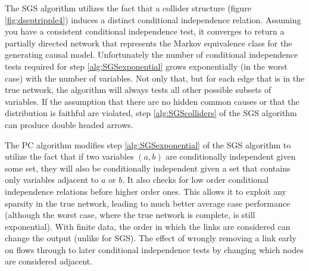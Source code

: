 \documentclass[11pt,a4paper,oneside]{book}
\begin{document}
The SGS algorithm utilizes the fact that a collider structure (figure \ref{fig:dseptripple4}) induces a distinct conditional independence relation. Assuming you have a consistent conditional independence test, it converges to return a partially directed network that represents the Markov equivalence class for the generating causal model. Unfortunately the number of conditional independence tests required for step \ref{alg:SGSexponential} grows exponentially (in the worst case) with the number of variables. Not only that, but for each edge that is in the true network, the algorithm will always tests all other possible subsets of variables. If the assumption that there are no hidden common causes or that the distribution is faithful are violated, step \ref{alg:SGScolliders} of the SGS algorithm can produce double headed arrows.

The PC algorithm \cite{Sprites} modifies step \ref{alg:SGSexponential} of the SGS algorithm to utilize the fact that if two variables $(a,b)$ are conditionally independent given some set, they will also be conditionally independent given a set that contains only variables adjacent to $a$ or $b$. It also checks for low order conditional independence relations before higher order ones. This allows it to exploit any sparsity in the true network, leading to much better average case performance  \cite{Sprites} (although the worst case, where the true network is complete, is still exponential). With finite data, the order in which the links are considered can change the output (unlike for SGS). The effect of wrongly removing a link early on flows through to later conditional independence tests by changing which nodes are considered adjacent.
\end{document}
